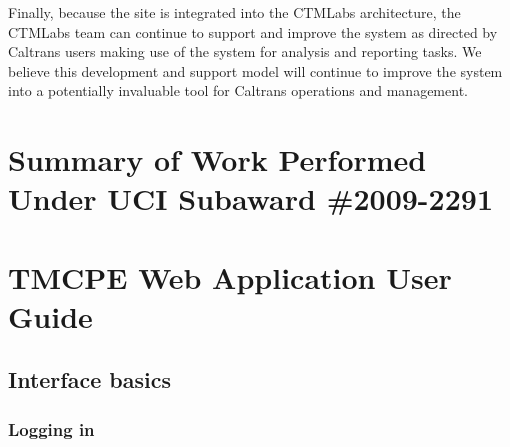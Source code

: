 \documentclass[12pt]{report}
\newif\ifuserguide %
\renewcommand{\fixme}[3][]{#1\xspace}
\newcounter{space}
\begin{document}
Finally, because the site is integrated into the \ac{CTMLabs}
architecture, the \ac{CTMLabs} team can continue to support and
improve the system as directed by Caltrans users making use of the
system for analysis and reporting tasks.  We believe this development
and support model will continue to improve the system into a
potentially invaluable tool for Caltrans operations and management.







\clearpage

\appendix


\chapter{Summary of Work Performed Under UCI Subaward \#2009-2291}
\label{chap:actlog-sub}

\clearpage



\clearpage


\ifuserguide%

\chapter{TMCPE Web Application User Guide}
\label{chap:user-guide}

\fixme{crindt}{Link to the use cases (section~\ref{sec:use-cases}.)}

\section{Interface basics}
\label{sec:ui-basics}

\subsection{Logging in}
\label{sec:ui-login}
\end{document}
